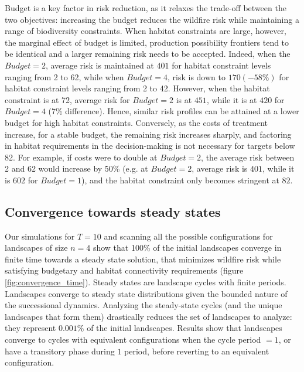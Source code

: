Budget is a key factor in risk reduction, as it relaxes the trade-off between the two objectives: increasing the budget reduces the wildfire risk while maintaining a range of biodiversity constraints.  When habitat constraints are large, however, the marginal effect of budget is limited, production possibility frontiers tend to be identical and a larger remaining risk needs to be accepted.  Indeed, when the $Budget =2$, average risk is maintained at $401$ for habitat constraint levels ranging from 2 to 62, while when $Budget=4$, risk is down to $170 (-58\%)$ for habitat constraint levels ranging from 2 to 42.  
However, when the habitat constraint is at 72, average risk for $Budget=2$ is at $451$, while it is at $420$ for $Budget=4$ (7\% difference). Hence, similar risk profiles can be attained at a lower budget for high habitat constraints. 
Conversely, as the costs of treatment increase, for a stable budget, the remaining risk increases sharply, and factoring in habitat requirements in the decision-making is not necessary for targets below 82. For example, if costs were to double at $Budget=2$, the average risk between 2 and 62 would increase by 50\% (e.g. at $Budget=2$, average risk is $401$, while it is $602$ for $Budget=1$), and the habitat constraint only becomes stringent at $82$. 

\FloatBarrier
\subsection{Convergence towards steady states}
Our simulations for $T=10$ and scanning all the possible configurations for landscapes of size $n=4$ show that 100\% of the initial landscapes converge in finite time towards a steady state solution, that minimizes wildfire risk while satisfying budgetary and habitat connectivity requirements (figure \ref{fig:convergence_time}).
Steady states are landscape cycles with finite periods. Landscapes converge to steady state distributions given the bounded nature of the successional dynamics. Analyzing the steady-state cycles (and the unique landscapes that form them) drastically reduces the set of landscapes to analyze: they represent $0.001\%$ of the initial landscapes. Results show that landscapes converge to cycles with equivalent configurations when the cycle period $=1$, or have a transitory phase during $1$ period, before reverting to an equivalent configuration. 

